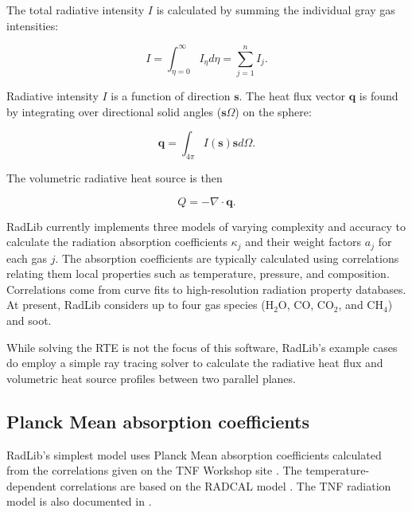 \documentclass[preprint,12pt, a4paper]{elsarticle}
\begin{document}
The total radiative intensity $I$ is calculated by summing the individual gray gas intensities:
%
\begin{linenomath}
\begin{equation}
	I=\int_{\eta=0}^{\infty}I_{\eta}d\eta=\sum_{j=1}^n I_j.
\end{equation}
\end{linenomath}
%
Radiative intensity $I$ is a function of direction $\mathbf{s}$. The heat flux vector $\mathbf{q}$ is found by integrating over directional solid angles ($\mathbf{s}\Omega$) on the sphere:
%
\begin{linenomath}
\begin{equation}
    \mathbf{q} = \int_{4\pi}I(\mathbf{s})\mathbf{s}d\Omega.
\end{equation}
\end{linenomath}
%
The volumetric radiative heat source is then 
%
\begin{linenomath}
\begin{equation}
    Q = -\nabla\cdot\mathbf{q}.
\end{equation}
\end{linenomath}
%

RadLib currently implements three models of varying complexity and accuracy to calculate the radiation absorption coefficients $\kappa_j$ and their weight factors $a_j$ for each gas $j$. The absorption coefficients are typically calculated using correlations relating them local properties such as temperature, pressure, and composition. Correlations come from curve fits to high-resolution radiation property databases. At present, RadLib considers up to four gas species (H$_2$O, CO, CO$_2$, and CH$_4$) and soot. 

While solving the RTE is not the focus of this software, RadLib's example cases do employ a simple ray tracing solver to calculate the radiative heat flux and volumetric heat source profiles between two parallel planes. 



\subsection{Planck Mean absorption coefficients} \label{s:planckmean}

RadLib's simplest model uses Planck Mean absorption coefficients calculated from the correlations given on the TNF Workshop site \citep{Smith_2003}. The temperature-dependent correlations are based on the RADCAL model \citep{Grosshandler_1993}. The TNF radiation model is also documented in \citep{Barlow_2001}.
\end{document}
